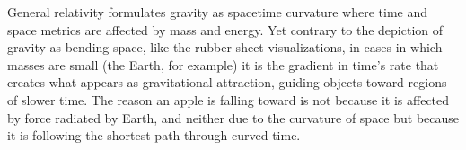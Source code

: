 General relativity formulates gravity as spacetime curvature where time and space metrics are affected by mass and energy. Yet contrary to the depiction of gravity as bending space, like the rubber sheet visualizations, in cases in which masses are small (the Earth, for example) it is the gradient in time's rate that creates what appears as gravitational attraction, guiding objects toward regions of slower time. The reason an apple is falling toward is not because it is affected by force radiated by Earth, and neither due to the curvature of space but because it is following the shortest path through curved time.
